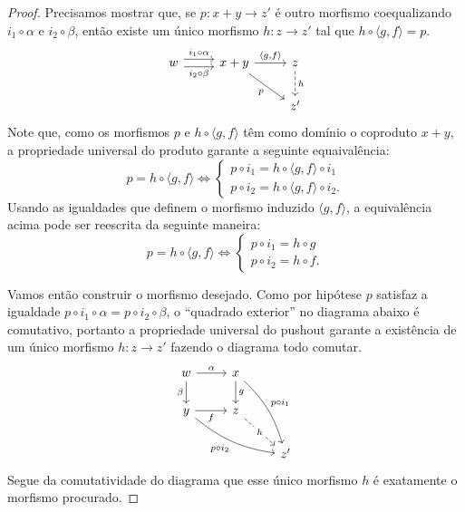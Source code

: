 \begin{proof}
    Precisamos mostrar que, se $p: x+y \to z'$ é outro morfismo coequalizando $i_1 \circ \alpha$ e $i_2 \circ \beta$, então existe um único morfismo $h: z \to z'$ tal que $h \circ \langle g,f \rangle = p$.
    \begin{displaymath}
        \begin{tikzcd}
            w
            \arrow[r, shift left=1.25, "i_1 \circ \alpha"]
            \arrow[r, shift right=1.25, "i_2 \circ \beta" swap]
            & x+y
            \arrow[r, "{\langle g,f \rangle}"]
            \arrow[rd, "p" swap]
            & z
            \arrow[d, dashed, "h"]
            \\ & & z'
        \end{tikzcd}
    \end{displaymath}
    Note que, como os morfismos $p$ e $h \circ \langle g,f \rangle$ têm como domínio o coproduto $x+y$, a propriedade universal do produto garante a seguinte equaivalência:
    \begin{displaymath}
        p = h \circ \langle g,f \rangle
        \iff
        \begin{cases}
            p \circ i_1 = h \circ \langle g,f \rangle \circ i_1 \\
            p \circ i_2 = h \circ \langle g,f \rangle \circ i_2.
        \end{cases}
    \end{displaymath}
    Usando as igualdades que definem o morfismo induzido $\langle g,f \rangle$, a equivalência acima pode ser reescrita da seguinte maneira:
    \begin{displaymath}
        p = h \circ \langle g,f \rangle \iff
        \begin{cases}
            p \circ i_1 = h \circ g \\
            p \circ i_2 = h \circ f.
        \end{cases}
    \end{displaymath}
    
    Vamos então construir o morfismo desejado.
    Como por hipótese $p$ satisfaz a igualdade $p \circ i_1 \circ \alpha = p \circ i_2 \circ \beta$, o ``quadrado exterior'' no diagrama abaixo é comutativo, portanto a propriedade universal do pushout garante a existência de um único morfismo $h: z \to z'$ fazendo o diagrama todo comutar.
    \begin{displaymath}
        \begin{tikzcd}
            w
            \arrow[r, "\alpha"]
            \arrow[d, "\beta" swap]
            & x
            \arrow[d, "g"]
            \arrow[rdd, bend left=15, "p \circ i_1"]
            \\ y
            \arrow[r, "f" swap]
            \arrow[rrd, bend right=15, "p \circ i_2" swap]
            & z
            \arrow[rd, dashed, "h" description]
            \\ & & z'
        \end{tikzcd}
    \end{displaymath}
    Segue da comutatividade do diagrama que esse único morfismo $h$ é exatamente o morfismo procurado.


\end{proof}

